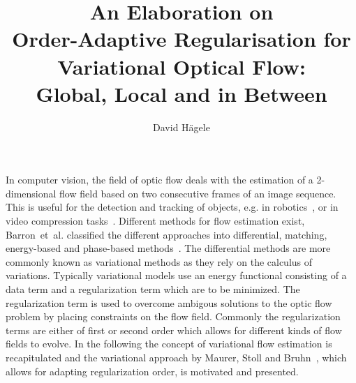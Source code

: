 \documentclass[journal]{vgtc}
\author{David H\"agele}
\title{An Elaboration on\\Order-Adaptive Regularisation for Variational Optical Flow:\\Global, Local and in Between}
\begin{document}


\maketitle

In computer vision, the field of optic flow deals with the estimation of a 2-dimensional flow field based on two consecutive frames of an image sequence.
This is useful for the detection and tracking of objects, e.g. in robotics~\cite{robotics}, or in video compression tasks~\cite{videocoding}.
Different methods for flow estimation exist, Barron~et~al. classified the different approaches into differential, matching, energy-based and phase-based methods~\cite{opticflowtechniques}.
The differential methods are more commonly known as variational methods as they rely on the calculus of variations.
Typically variational models use an energy functional consisting of a data term and a regularization term which are to be minimized.
The regularization term is used to overcome ambigous solutions to the optic flow problem by placing constraints on the flow field.
Commonly the regularization terms are either of first or second order which allows for different kinds of flow fields to evolve.
In the following the concept of variational flow estimation is recapitulated and the variational approach by Maurer, Stoll and Bruhn~\cite{daspaper}, which allows for adapting regularization order, is motivated and presented.
\end{document}
